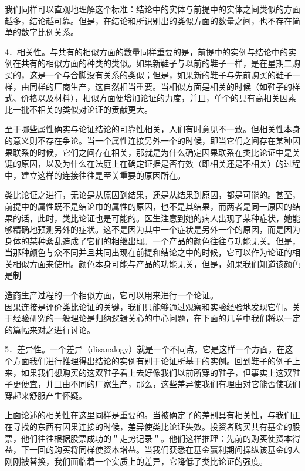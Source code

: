 我们同样可以直观地理解这个标准：结论中的实体与前提中的实体之间类似的方面越多，结论越可靠。但是，在结论和所识别出的类似方面的数量之间，也不存在简单的数字比例关系。

4．相关性。与共有的相似方面的数量同样重要的是，前提中的实例与结论中的实例在共有的相似方面的种类的类似。如果新鞋子与以前的鞋子一样，是在星期二购买的，这是一个与合脚没有关系的类似；但是，如果新的鞋子与先前购买的鞋子一样，由同样的厂商生产，这自然相当重要。当相似方面是相关的时候（如鞋子的样式、价格以及材料），相似方面便增加论证的力度，并且，单个的具有高相关因素比一批不相关的类似对论证的贡献更大。

至于哪些属性确实与论证结论的可靠性相关，人们有时意见不一致。但相关性本身的意义则不存在争论。当一个属性连接另外一个的时候，即当它们之间存在某种因果联系的时候，它们之间存在相关，那就是为什么确定因果联系在类比论证中是关键的原因，以及为什么在法庭上在确定证据是否有效（即相关还是不相关）的过程中，建立这样的连接往往是至关重要的原因所在。

类比论证之进行，无论是从原因到结果，还是从结果到原因，都是可能的。甚至，前提中的属性既不是结论巾的属性的原因，也不是其结果，而两者是同一原因的结果的话，此时，类比论证也是可能的。医生注意到她的病人出现了某种症状，她能够精确地预测另外的症状。这不是因为其中一个症状是另外一个的原因，而是因为身体的某种紊乱造成了它们的相继出现。一个产品的颜色往往与功能无关。但是，当那种颜色与众不同并且共同出现在前提和结论之中的时候，它可以作为论证的相关相似方面来使用。颜色本身可能与产品的功能无关，但是，如果我们知道该颜色是制

造商生产过程的一个相似方面，它可以用来进行一个论证。\\
因果连接是评价类比论证的关键，我们只能够通过观察和实验经验地发现它们。关于经验研究的一般理论是归纳逻辑关心的中心问题，在下面的几章中我们将以一定的篇幅来对之进行讨论。

5．差异性。一个差异（disanalogy）就是一个不同点，它是这样一个方面，在这个方面我们进行推理得出结论的实例有别于论证所基于的实例。回到鞋子的例子上来，如果我们想购买的这双鞋子看上去好像我们以前所穿的鞋子，但事实上这双鞋子更便宜，并且由不同的厂家生产，那么，这些差异使我们有理由对它能否使我们穿起来舒服产生怀疑。

上面论述的相关性在这里同样是重要的。当被确定了的差别具有相关性，与我们正在寻找的东西有因果连接的时候，差异使类比论证失效。投资者购买共有基金的股票，他们往往根据股票成功的＂走势记录＂。他们这样推理：先前的购买使资本得益，下一回的购买将同样使资本增益。当我们获悉在基金赢利期间操纵该基金的人刚刚被替换，我们面临着一个实质上的差异，它降低了类比论证的强度。

